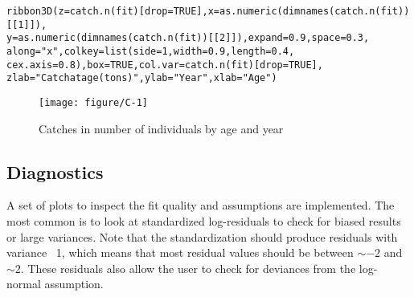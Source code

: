 \documentclass[a4paper,english,10pt]{article}\usepackage[]{graphicx}\usepackage[]{color}
\makeatletter
\def\maxwidth{ %
  \ifdim\Gin@nat@width>\linewidth
    \linewidth
  \else
    \Gin@nat@width
  \fi
}
\newcommand{\hlnum}[1]{\textcolor[rgb]{0.2,0.2,0.2}{#1}}%
\newcommand{\hlstr}[1]{\textcolor[rgb]{0.2,0.2,0.2}{#1}}%
\newcommand{\hlstd}[1]{\textcolor[rgb]{0,0,0}{#1}}%
\newcommand{\hlkwc}[1]{\textcolor[rgb]{0.361,0.506,0.596}{#1}}%
\newcommand{\hlkwd}[1]{\textcolor[rgb]{0.361,0.506,0.596}{#1}}%
\newenvironment{kframe}{%
 \def\at@end@of@kframe{}%
 \ifinner\ifhmode%
  \def\at@end@of@kframe{\end{minipage}}%
  \begin{minipage}{\columnwidth}%
 \fi\fi%
 \def\FrameCommand##1{\hskip\@totalleftmargin \hskip-\fboxsep
 \colorbox{shadecolor}{##1}\hskip-\fboxsep
     \hskip-\linewidth \hskip-\@totalleftmargin \hskip\columnwidth}%
 \MakeFramed {\advance\hsize-\width
   \@totalleftmargin\z@ \linewidth\hsize
   \@setminipage}}%
 {\par\unskip\endMakeFramed%
 \at@end@of@kframe}
\newenvironment{knitrout}{}{} %
\makeatother
\begin{document}
\begin{knitrout}
\color{fgcolor}\begin{kframe}
\begin{alltt}
\hlkwd{ribbon3D}\hlstd{(} \hlkwc{z} \hlstd{=} \hlkwd{catch.n}\hlstd{(fit)[}\hlkwc{drop}\hlstd{=}\hlnum{TRUE}\hlstd{],} \hlkwc{x}\hlstd{=} \hlkwd{as.numeric}\hlstd{(}\hlkwd{dimnames}\hlstd{(}\hlkwd{catch.n}\hlstd{(fit))[[}\hlnum{1}\hlstd{]]),}
          \hlkwc{y}\hlstd{=} \hlkwd{as.numeric}\hlstd{(}\hlkwd{dimnames}\hlstd{(}\hlkwd{catch.n}\hlstd{(fit))[[}\hlnum{2}\hlstd{]]) ,} \hlkwc{expand} \hlstd{=} \hlnum{0.9}\hlstd{,} \hlkwc{space} \hlstd{=} \hlnum{0.3}\hlstd{,}
          \hlkwc{along} \hlstd{=} \hlstr{"x"}\hlstd{,} \hlkwc{colkey} \hlstd{=} \hlkwd{list}\hlstd{(} \hlkwc{side}\hlstd{=}\hlnum{1}\hlstd{,} \hlkwc{width} \hlstd{=} \hlnum{0.9}\hlstd{,} \hlkwc{length} \hlstd{=} \hlnum{0.4}\hlstd{,}
          \hlkwc{cex.axis} \hlstd{=} \hlnum{0.8}\hlstd{),}\hlkwc{box} \hlstd{=} \hlnum{TRUE}\hlstd{,} \hlkwc{col.var}\hlstd{=}\hlkwd{catch.n}\hlstd{(fit)[}\hlkwc{drop}\hlstd{=}\hlnum{TRUE}\hlstd{] ,}
          \hlkwc{zlab}\hlstd{=}\hlstr{"Catch at age (tons)"}\hlstd{,} \hlkwc{ylab}\hlstd{=}\hlstr{"Year"}\hlstd{,} \hlkwc{xlab}\hlstd{=}\hlstr{"Age"}\hlstd{)}
\end{alltt}
\end{kframe}\begin{figure}[H]

{\centering \texttt{[image: figure/C-1]} 

}

\caption[Catches in number of individuals by age and year]{Catches in number of individuals by age and year}\label{fig:C}
\end{figure}


\end{knitrout}

\subsection{Diagnostics}

A set of plots to inspect the fit quality and assumptions are implemented. The most common is to look at standardized log-residuals to check for biased results or large variances. Note that the standardization should produce residuals with variance ~1, which means that most residual values should be between $\sim -2$ and $\sim 2$. These residuals also allow the user to check for deviances from the log-normal assumption.
\end{document}
